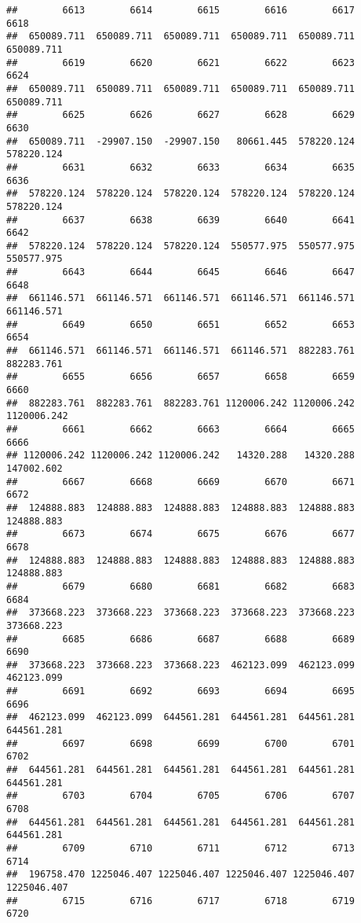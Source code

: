 \documentclass[
]{book}
\begin{document}
\begin{verbatim}
##        6613        6614        6615        6616        6617        6618 
##  650089.711  650089.711  650089.711  650089.711  650089.711  650089.711 
##        6619        6620        6621        6622        6623        6624 
##  650089.711  650089.711  650089.711  650089.711  650089.711  650089.711 
##        6625        6626        6627        6628        6629        6630 
##  650089.711  -29907.150  -29907.150   80661.445  578220.124  578220.124 
##        6631        6632        6633        6634        6635        6636 
##  578220.124  578220.124  578220.124  578220.124  578220.124  578220.124 
##        6637        6638        6639        6640        6641        6642 
##  578220.124  578220.124  578220.124  550577.975  550577.975  550577.975 
##        6643        6644        6645        6646        6647        6648 
##  661146.571  661146.571  661146.571  661146.571  661146.571  661146.571 
##        6649        6650        6651        6652        6653        6654 
##  661146.571  661146.571  661146.571  661146.571  882283.761  882283.761 
##        6655        6656        6657        6658        6659        6660 
##  882283.761  882283.761  882283.761 1120006.242 1120006.242 1120006.242 
##        6661        6662        6663        6664        6665        6666 
## 1120006.242 1120006.242 1120006.242   14320.288   14320.288  147002.602 
##        6667        6668        6669        6670        6671        6672 
##  124888.883  124888.883  124888.883  124888.883  124888.883  124888.883 
##        6673        6674        6675        6676        6677        6678 
##  124888.883  124888.883  124888.883  124888.883  124888.883  124888.883 
##        6679        6680        6681        6682        6683        6684 
##  373668.223  373668.223  373668.223  373668.223  373668.223  373668.223 
##        6685        6686        6687        6688        6689        6690 
##  373668.223  373668.223  373668.223  462123.099  462123.099  462123.099 
##        6691        6692        6693        6694        6695        6696 
##  462123.099  462123.099  644561.281  644561.281  644561.281  644561.281 
##        6697        6698        6699        6700        6701        6702 
##  644561.281  644561.281  644561.281  644561.281  644561.281  644561.281 
##        6703        6704        6705        6706        6707        6708 
##  644561.281  644561.281  644561.281  644561.281  644561.281  644561.281 
##        6709        6710        6711        6712        6713        6714 
##  196758.470 1225046.407 1225046.407 1225046.407 1225046.407 1225046.407 
##        6715        6716        6717        6718        6719        6720 

\end{verbatim}
\end{document}

